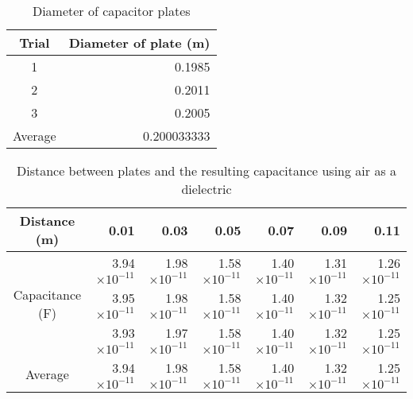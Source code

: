 \documentclass [12pt, letterpaper, twoside] {article}
\begin{document}
\begin{table}[h!]
  \centering
  \begin{tabular}{| c | r |}
    \hline\hline
    Trial & Diameter of plate (m) \\
    \hline
    1 & 0.1985 \\
    \hline
    2 & 0.2011 \\
    \hline
    3 & 0.2005 \\
    \hline
    Average & 0.200033333 \\
    \hline\hline
  \end{tabular}
  \caption{Diameter of capacitor plates}
\end{table}

\begin{table}[h!]
  \centering
  \begin{tabular}{| c | r | r | r | r | r | r |}
    \hline\hline
    Distance (m) & 0.01 & 0.03 & 0.05 & 0.07 & 0.09 & 0.11 \\
    \hline
    \multirow {3}{*}{Capacitance (F)} & 3.94\(\times10^{-11}\) & 1.98\(\times10^{-11}\) & 1.58\(\times10^{-11}\) & 1.40\(\times10^{-11}\) & 1.31\(\times10^{-11}\) & 1.26\(\times10^{-11}\) \\
    & 3.95\(\times10^{-11}\) & 1.98\(\times10^{-11}\) & 1.58\(\times10^{-11}\) & 1.40\(\times10^{-11}\) & 1.32\(\times10^{-11}\) & 1.25\(\times10^{-11}\) \\
    & 3.93\(\times10^{-11}\) & 1.97\(\times10^{-11}\) & 1.58\(\times10^{-11}\) & 1.40\(\times10^{-11}\) & 1.32\(\times10^{-11}\) & 1.25\(\times10^{-11}\) \\
    \hline
    Average & 3.94\(\times10^{-11}\) & 1.98\(\times10^{-11}\) & 1.58\(\times10^{-11}\) & 1.40\(\times10^{-11}\) & 1.32\(\times10^{-11}\) & 1.25\(\times10^{-11}\) \\ %
    \hline\hline
  \end{tabular}
  \caption{Distance between plates and the resulting capacitance using air as a dielectric}
\end{table}
\end{document}
